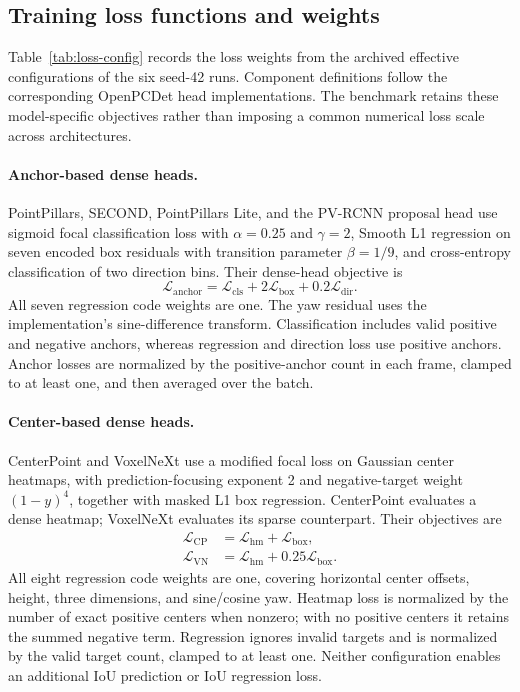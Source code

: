 \documentclass[10pt,twocolumn]{article}
\begin{document}
\FloatBarrier
\subsection{Training loss functions and weights}
\label{app:loss}
Table~\ref{tab:loss-config} records the loss weights from the archived effective configurations of the six seed-42 runs. Component definitions follow the corresponding OpenPCDet head implementations. The benchmark retains these model-specific objectives rather than imposing a common numerical loss scale across architectures.

\paragraph{Anchor-based dense heads.}
PointPillars, SECOND, PointPillars Lite, and the PV-RCNN proposal head use sigmoid focal classification loss with $\alpha=0.25$ and $\gamma=2$, Smooth L1 regression on seven encoded box residuals with transition parameter $\beta=1/9$, and cross-entropy classification of two direction bins. Their dense-head objective is
\begin{equation}
\mathcal{L}_{\mathrm{anchor}}
=\mathcal{L}_{\mathrm{cls}}+2\mathcal{L}_{\mathrm{box}}
+0.2\mathcal{L}_{\mathrm{dir}}.
\end{equation}
All seven regression code weights are one. The yaw residual uses the implementation's sine-difference transform. Classification includes valid positive and negative anchors, whereas regression and direction loss use positive anchors. Anchor losses are normalized by the positive-anchor count in each frame, clamped to at least one, and then averaged over the batch.

\paragraph{Center-based dense heads.}
CenterPoint and VoxelNeXt use a modified focal loss on Gaussian center heatmaps, with prediction-focusing exponent 2 and negative-target weight $(1-y)^4$, together with masked L1 box regression. CenterPoint evaluates a dense heatmap; VoxelNeXt evaluates its sparse counterpart. Their objectives are
\begin{align}
\mathcal{L}_{\mathrm{CP}}&=\mathcal{L}_{\mathrm{hm}}+\mathcal{L}_{\mathrm{box}},\\
\mathcal{L}_{\mathrm{VN}}&=\mathcal{L}_{\mathrm{hm}}+0.25\mathcal{L}_{\mathrm{box}}.
\end{align}
All eight regression code weights are one, covering horizontal center offsets, height, three dimensions, and sine/cosine yaw. Heatmap loss is normalized by the number of exact positive centers when nonzero; with no positive centers it retains the summed negative term. Regression ignores invalid targets and is normalized by the valid target count, clamped to at least one. Neither configuration enables an additional IoU prediction or IoU regression loss.
\end{document}
